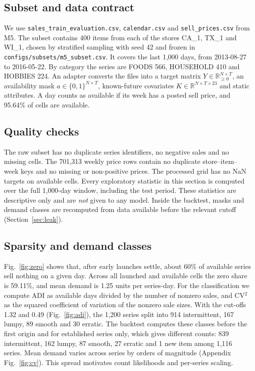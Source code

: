 \documentclass[conference]{IEEEtran}
\newcommand{\avail}{a}
\begin{document}
\subsection{Subset and data contract}
We use \texttt{sales\_train\_evaluation.csv}, \texttt{calendar.csv} and \texttt{sell\_prices.csv} from M5. The subset contains 400 items from each of the stores CA\_1, TX\_1 and WI\_1, chosen by stratified sampling with seed 42 and frozen in \texttt{configs/subsets/m5\_subset.csv}. It covers the last 1,000 days, from 2013-08-27 to 2016-05-22. By category the series are FOODS 566, HOUSEHOLD 410 and HOBBIES 224. An adapter converts the files into a target matrix $Y\in\mathbb{R}_{\ge0}^{N\times T}$, an availability mask $\avail\in\{0,1\}^{N\times T}$, known-future covariates $K\in\mathbb{R}^{N\times T\times 23}$ and static attributes. A day counts as available if its week has a posted sell price, and 95.64\% of cells are available.

\subsection{Quality checks}
The raw subset has no duplicate series identifiers, no negative sales and no missing cells. The 701,313 weekly price rows contain no duplicate store--item--week keys and no missing or non-positive prices. The processed grid has no NaN targets on available cells. Every exploratory statistic in this section is computed over the full 1,000-day window, including the test period. These statistics are descriptive only and are \emph{not} given to any model. Inside the backtest, masks and demand classes are recomputed from data available before the relevant cutoff (Section~\ref{sec:leak}).

\subsection{Sparsity and demand classes}
Fig.~\ref{fig:zero} shows that, after early launches settle, about 60\% of available series sell nothing on a given day. Across all launched and available cells the zero share is 59.11\%, and mean demand is 1.25 units per series-day. For the classification we compute ADI as available days divided by the number of nonzero sales, and CV$^2$ as the squared coefficient of variation of the nonzero sale sizes. With the cut-offs 1.32 and 0.49 (Fig.~\ref{fig:adi}), the 1,200 series split into 914 intermittent, 167 lumpy, 89 smooth and 30 erratic. The backtest computes these classes before the first origin and for established series only, which gives different counts: 839 intermittent, 162 lumpy, 87 smooth, 27 erratic and 1 new item among 1,116 series. Mean demand varies across series by orders of magnitude (Appendix Fig.~\ref{fig:cv}). This spread motivates count likelihoods and per-series scaling.
\end{document}
